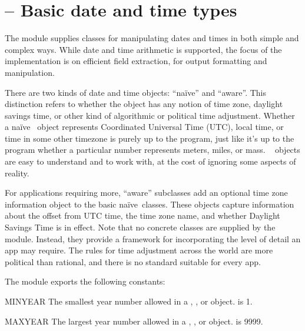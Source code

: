 
\section{ -- 
         Basic date and time types}


\newcommand{\naive}{na\"ive}

The  module supplies classes for manipulating dates
and times in both simple and complex ways.  While date and time
arithmetic is supported, the focus of the implementation is on
efficient field extraction, for output formatting and manipulation.

There are two kinds of date and time objects: ``\naive'' and ``aware''.
This distinction refers to whether the object has any notion of time
zone, daylight savings time, or other kind of algorithmic or political
time adjustment.  Whether a \naive\  object represents
Coordinated Universal Time (UTC), local time, or time in some other
timezone is purely up to the program, just like it's up to the program
whether a particular number represents meters, miles, or mass.  \Naive\
 objects are easy to understand and to work with, at
the cost of ignoring some aspects of reality.

For applications requiring more, ``aware''  subclasses add an
optional time zone information object to the basic \naive\ classes.
These \class{tzinfo} objects capture information about the offset from
UTC time, the time zone name, and whether Daylight Savings Time is in
effect.  Note that no concrete \class{tzinfo} classes are supplied by
the \module{datetime} module.  Instead, they provide a framework for
incorporating the level of detail an app may require.  The rules for
time adjustment across the world are more political than rational, and
there is no standard suitable for every app.

The  module exports the following constants:

\begin{datadesc}{MINYEAR}
    The smallest year number allowed in a , 
    , or   
    object.   is 1.
\end{datadesc}

\begin{datadesc}{MAXYEAR}
    The largest year number allowed in a , 
    , or   
    object.   is 9999.
\end{datadesc}


